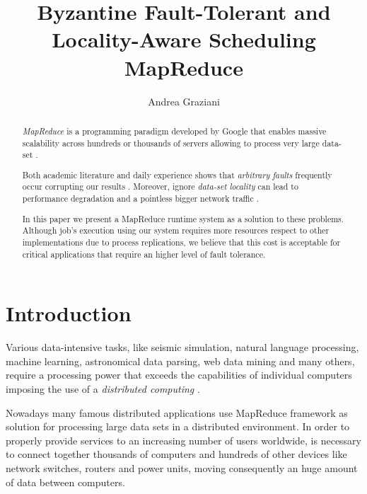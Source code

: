 \documentclass[sigchi]{acmart}
\begin{document}
\title{Byzantine Fault-Tolerant and Locality-Aware Scheduling MapReduce}

\author{Andrea Graziani}

\renewcommand{\shortauthors}{Andrea Graziani (0273395)}





\begin{abstract}
\textit{MapReduce} is a programming paradigm developed by Google that enables massive scalability across hundreds or thousands of servers allowing to process very large data-set \cite{IBMWhatIsMapReduce}.

Both academic literature and daily experience shows that \textit{arbitrary faults} frequently occur corrupting our results \cite{BFLMapReduce}. Moreover, ignore \textit{data-set locality} can lead to performance degradation and a pointless bigger network traffic \cite{LARTS}.

In this paper we present a MapReduce runtime system as a solution to these problems. Although job's execution using our system requires more resources respect to other implementations due to process replications, we believe that this cost is acceptable for critical applications that require an higher level of fault tolerance.
\end{abstract}

\maketitle

\section{Introduction}

Various data-intensive tasks, like seismic simulation, natural language processing, machine learning, astronomical data parsing, web data mining and many others, require a processing power that exceeds the capabilities of individual computers imposing the use of a \textit{distributed computing} \cite{LARTS}.

Nowadays many famous distributed applications use MapReduce framework as solution for processing large data sets in a distributed environment. In order to properly provide services to an increasing number of users worldwide, is necessary to connect together thousands of computers and hundreds of other devices like network switches, routers and power units, moving consequently an huge amount of data between computers. 
\end{document}
